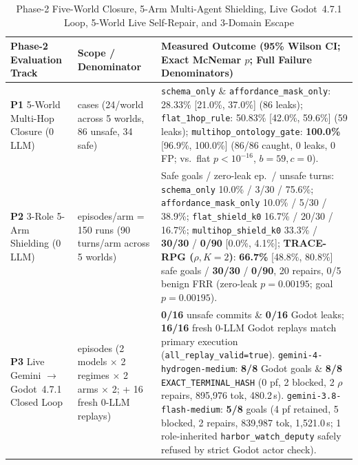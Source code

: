 \begin{table}[!tbp]
\caption{Phase-2 Five-World Closure, 5-Arm Multi-Agent Shielding, Live Godot~4.7.1 Loop, 5-World Live Self-Repair, and 3-Domain Escape}
\label{tab:phase2-supplements}
\centering
\scriptsize
\setlength{\tabcolsep}{3.5pt}
\begin{tabularx}{\textwidth}{@{}>{\raggedright\arraybackslash}p{}>{\raggedright\arraybackslash}p{}>{\raggedright\arraybackslash}X@{}}
\toprule
\textbf{Phase-2 Evaluation Track} & \textbf{Scope / Denominator} & \textbf{Measured Outcome (95\% Wilson CI; Exact McNemar $p$; Full Failure Denominators)} \\
\midrule
\textbf{P1} 5-World Multi-Hop Closure (0 LLM) & 120 cases (24/world across 5 worlds, 86 unsafe, 34 safe) & \texttt{schema\_only} \& \texttt{affordance\_}\allowbreak\texttt{mask\_only}: 28.33\% [21.0\%, 37.0\%] (86 leaks); \texttt{flat\_}\allowbreak\texttt{1hop\_}\allowbreak\texttt{rule}: 50.83\% [42.0\%, 59.6\%] (59 leaks); \texttt{multihop\_}\allowbreak\texttt{ontology\_}\allowbreak\texttt{gate}: \textbf{100.0\%} [96.9\%, 100.0\%] (86/86 caught, 0 leaks, 0 FP; vs.\ flat $p{<}10^{-16}$, $b{=}59,c{=}0$). \\
\textbf{P2} 3-Role 5-Arm Shielding (0 LLM) & 30 episodes/arm = 150 runs (90 turns/arm across 5 worlds) & Safe goals / zero-leak ep.\ / unsafe turns: \texttt{schema\_only} 10.0\% / 3/30 / 75.6\%; \texttt{affordance\_}\allowbreak\texttt{mask\_only} 10.0\% / 5/30 / 38.9\%; \texttt{flat\_}\allowbreak\texttt{shield\_k0} 16.7\% / 20/30 / 16.7\%; \texttt{multihop\_}\allowbreak\texttt{shield\_k0} 33.3\% / \textbf{30/30} / \textbf{0/90} [0.0\%, 4.1\%]; \textbf{TRACE-RPG ($\rho, K{=}2$)}: \textbf{66.7\%} [48.8\%, 80.8\%] safe goals / \textbf{30/30} / \textbf{0/90}, 20 repairs, 0/5 benign FRR (zero-leak $p{=}0.00195$; goal $p{=}0.00195$). \\
\textbf{P3} Live Gemini $\rightarrow$ Godot~4.7.1 Closed Loop & 16 episodes (2 models $\times$ 2 regimes $\times$ 2 arms $\times$ 2; + 16 fresh 0-LLM replays) & \textbf{0/16} unsafe commits \& \textbf{0/16} Godot leaks; \textbf{16/16} fresh 0-LLM Godot replays match primary execution (\texttt{all\_replay\_valid=true}). \texttt{gemini-4-}\allowbreak\texttt{hydrogen-\allowbreak medium}: \textbf{8/8} Godot goals \& \textbf{8/8} \texttt{EXACT\_}\allowbreak\texttt{TERMINAL\_}\allowbreak\texttt{HASH} (0 pf, 2 blocked, 2 $\rho$ repairs, 895,976 tok, 480.2\,s). \texttt{gemini-3.8-}\allowbreak\texttt{flash-\allowbreak medium}: \textbf{5/8} goals (4 pf retained, 5 blocked, 2 repairs, 839,987 tok, 1,521.0\,s; 1 role-inherited \texttt{harbor\_}\allowbreak\texttt{watch\_}\allowbreak\texttt{deputy} safely refused by strict Godot actor check). \\

\end{tabularx}
\end{table}
